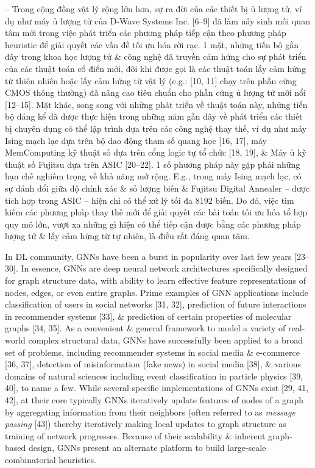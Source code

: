 \documentclass{article}
\begin{document}
\begin{itemize}
    -- Trong cộng đồng vật lý rộng lớn hơn, sự ra đời của các thiết bị ủ lượng tử, ví dụ như máy ủ lượng tử của D-Wave Systems Inc. [6--9] đã làm nảy sinh mối quan tâm mới trong việc phát triển các phương pháp tiếp cận theo phương pháp heuristic để giải quyết các vấn đề tối ưu hóa rời rạc. 1 mặt, những tiến bộ gần đây trong khoa học lượng tử \& công nghệ đã truyền cảm hứng cho sự phát triển của các thuật toán cổ điển mới, đôi khi được gọi là các thuật toán lấy cảm hứng từ thiên nhiên hoặc lấy cảm hứng từ vật lý (e.g.:  [10, 11] chạy trên phần cứng CMOS thông thường) đã nâng cao tiêu chuẩn cho phần cứng ủ lượng tử mới nổi [12--15]. Mặt khác, song song với những phát triển về thuật toán này, những tiến bộ đáng kể đã được thực hiện trong những năm gần đây về phát triển các thiết bị chuyên dụng có thể lập trình dựa trên các công nghệ thay thế, ví dụ như máy Ising mạch lạc dựa trên bộ dao động tham số quang học [16, 17], máy MemComputing kỹ thuật số dựa trên cổng logic tự tổ chức [18, 19], \& Máy ủ kỹ thuật số Fujitsu dựa trên ASIC [20–22]. 1 số phương pháp này gặp phải những hạn chế nghiêm trọng về khả năng mở rộng. E.g., trong máy Ising mạch lạc, có sự đánh đổi giữa độ chính xác \& số lượng biến \& Fujitsu Digital Annealer -- được tích hợp trong ASIC -- hiện chỉ có thể xử lý tối đa 8192 biến. Do đó, việc tìm kiếm các phương pháp thay thế mới để giải quyết các bài toán tối ưu hóa tổ hợp quy mô lớn, vượt xa những gì hiện có thể tiếp cận được bằng các phương pháp lượng tử \& lấy cảm hứng từ tự nhiên, là điều rất đáng quan tâm.

    In DL community, GNNs have been a burst in popularity over last few years [23–30]. In essence, GNNs are deep neural network architectures specifically designed for graph structure data, with ability to learn effective feature representations of nodes, edges, or even entire graphs. Prime examples of GNN applications include classification of users in social networks [31, 32], prediction of future interactions in recommender systems [33], \& prediction of certain properties of molecular graphs [34, 35]. As a convenient \& general framework to model a variety of real-world complex structural data, GNNs have successfully been applied to a broad set of problems, including recommender systems in social media \& e-commerce [36, 37], detection of misinformation (fake news) in social media [38], \& various domains of natural sciences including event classification in particle physics [39, 40], to name a few. While several specific implementations of GNNs exist [29, 41, 42], at their core typically GNNs iteratively update features of nodes of a graph by aggregating information from their neighbors (often referred to as {\it message passing} [43]) thereby iteratively making local updates to graph structure as training of network progresses. Because of their scalability \& inherent graph-based design, GNNs present an alternate platform to build large-scale combinatorial heuristics.


\end{itemize}
\end{document}
